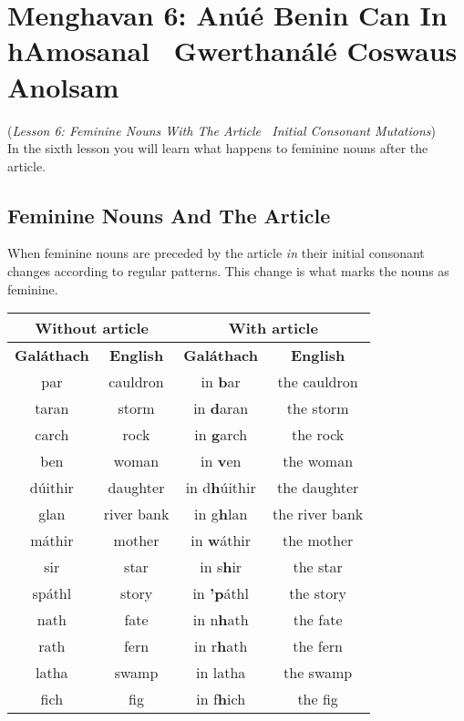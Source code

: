 \section{Menghavan 6: An\'{u}\'{e} Benin Can In hAmosanal \textendash\ Gwerthan\'{a}l\'{e} Coswaus Anolsam}
(\textit{Lesson 6: Feminine Nouns With The Article \textendash\ Initial Consonant Mutations})\\
In the sixth lesson you will learn what happens to feminine nouns after the article.

\subsection{Feminine Nouns And The Article}

When feminine nouns are preceded by the article \textit{in} their initial consonant changes according to regular patterns. This change is what marks the nouns as feminine.
\begin{table}[H]
\centering
\begin{tabular}{cccc}
  \toprule
  \multicolumn{2}{c}{\textbf{Without article}} & \multicolumn{2}{c}{\textbf{With article}}\\
  \midrule
  \textbf{Gal\'{a}thach} & \textbf{English} & \textbf{Gal\'{a}thach} & \textbf{English}\\
  \cmidrule(lr){1-1}\cmidrule(lr){2-2}\cmidrule(lr){3-3}\cmidrule(lr){4-4}
  par & cauldron & in \textbf{b}ar & the cauldron\\
  taran & storm & in \textbf{d}aran & the storm\\
  carch & rock & in \textbf{g}arch & the rock\\
  ben & woman & in \textbf{v}en & the woman\\
  d\'{u}ithir & daughter & in d\textbf{h}\'{u}ithir & the daughter\\
  glan & river bank & in g\textbf{h}lan & the river bank\\
  m\'{a}thir & mother & in \textbf{w}\'{a}thir & the mother\\
  sir & star & in s\textbf{h}ir & the star\\
  sp\'{a}thl & story & in \textbf{'p}\'{a}thl & the story\\
  nath & fate & in n\textbf{h}ath & the fate\\
  rath & fern & in r\textbf{h}ath & the fern\\
  latha & swamp & in latha & the swamp\\
  fich & fig & in f\textbf{h}ich & the fig\\
  \bottomrule
\end{tabular}
\label{examples_article_feminine_nouns}
\end{table}

